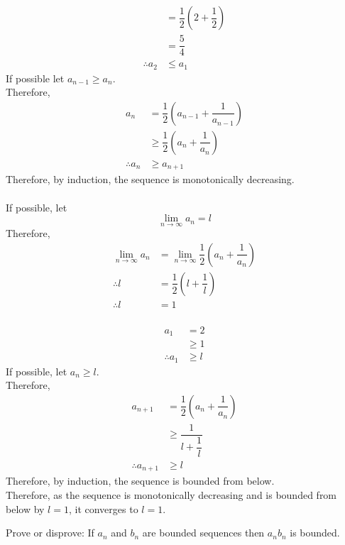 \documentclass[fleqn, a4paper, 12pt, oneside]{amsart}
\theoremstyle{definition}
\theoremstyle{theorem}
\begin{document}
\begin{solution}
\begin{tasks}
\begin{align*}
				&= \dfrac{1}{2} \left( 2 + \dfrac{1}{2} \right)\\
				&= \dfrac{5}{4}\\
				\therefore a_2 &\le a_1
			\end{align*}
			If possible let $a_{n - 1} \ge a_n$.\\
			Therefore,
			\begin{align*}
				a_n &= \dfrac{1}{2} \left( a_{n - 1} + \dfrac{1}{a_{n - 1}} \right)\\
				&\ge \dfrac{1}{2} \left( a_n + \dfrac{1}{a_n} \right)\\
				\therefore a_n &\ge a_{n + 1}
			\end{align*}
			Therefore, by induction, the sequence is monotonically decreasing.\\
			~\\
			If possible, let 
			\begin{equation*}
				\lim\limits_{n \to \infty} a_n = l
			\end{equation*}
			Therefore,
			\begin{align*}
				\lim\limits_{n \to \infty} a_n &= \lim\limits_{n \to \infty} \dfrac{1}{2} \left( a_n + \dfrac{1}{a_n} \right)\\
				\therefore l &= \dfrac{1}{2} \left( l + \dfrac{1}{l} \right)\\
				\therefore l &= 1
			\end{align*}
			~\\
			\begin{align*}
				a_1 &= 2\\
				&\ge 1\\
				\therefore a_1 &\ge l
			\end{align*}
			If possible, let $a_n \ge l$.\\
			Therefore,
			\begin{align*}
				a_{n + 1} &= \dfrac{1}{2} \left( a_n + \dfrac{1}{a_n} \right)\\
				&\ge \dfrac{1}{l + \dfrac{1}{l}}\\
				\therefore a_{n + 1} &\ge l
			\end{align*}
			Therefore, by induction, the sequence is bounded from below.\\
			Therefore, as the sequence is monotonically decreasing and is bounded from below by $l = 1$, it converges to $l = 1$.
	\end{tasks}
\end{solution}

\begin{question}
	Prove or disprove: If $a_n$ and $b_n$ are bounded sequences then $a_n b_n$ is bounded.
\end{question}
\end{document}
